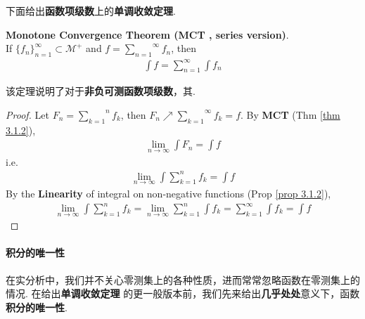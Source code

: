 	\newpage
	下面给出\textbf{函数项级数}上的\textbf{单调收敛定理}.
	\begin{thm}\label{thm 3.1.4}
		\textbf{Monotone Convergence Theorem (MCT , series version)}.\\
		If $\{ f_n \}_{n = 1}^{\infty} \subset \mathcal{M}^{+}$ and $f = \overset{\infty}{\underset{n = 1}{\sum}}{f_n}$, then
		\begin{align}
			\int{f} = \sum_{n = 1}^{\infty}{\int{f_n}}
		\end{align}
	
		\vspace{1em}
		\begin{rmk}
			该定理说明了对于\textbf{非负可测函数项级数}，其.
		\end{rmk}
	
		\vspace{1em}
		\begin{proof}
			Let $F_n = \overset{n}{\underset{k = 1}{\sum}}{f_k}$, then $F_n \nearrow \overset{\infty}{\underset{k = 1}{\sum}}{f_k} = f$. By \textbf{MCT} (Thm \ref{thm 3.1.2}),
			\begin{align}
				\lim_{n \to \infty}{\int{F_n}} = \int{f}
			\end{align}
			i.e.
			\begin{align}
				\lim_{n \to \infty}{\int{\sum_{k = 1}^{n}{f_k}}} = \int{f}
			\end{align}
			By the \textbf{Linearity} of integral on non-negative functions (Prop \ref{prop 3.1.2}),
			\begin{align}
				\lim_{n \to \infty}{\int{\sum_{k = 1}^{n}{f_k}}} = \lim_{n \to \infty}{\sum_{k = 1}^{n}{\int{f_k}}} = \sum_{k = 1}^{\infty}{\int{f_k}} = \int{f}
			\end{align}
		\end{proof}
	\end{thm}

\newpage
\paragraph{积分的唯一性}
	 在实分析中，我们并不关心零测集上的各种性质，进而常常忽略函数在零测集上的情况. 在给出\textbf{单调收敛定理} 的更一般版本前，我们先来给出\textbf{几乎处处}意义下，函数\textbf{积分的唯一性}.
	 
